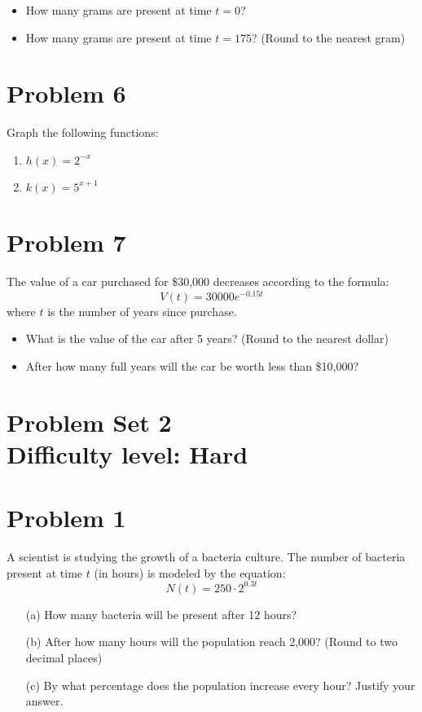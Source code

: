 \documentclass[12pt]{article}
\begin{document}
\begin{itemize}
    \item How many grams are present at time \( t = 0 \)?
    \item How many grams are present at time \( t = 175 \)? (Round to the nearest gram)
\end{itemize}

\section*{Problem 6}
Graph the following functions:
\begin{enumerate}[label=(\alph*)]
    \item \( h(x) = 2^{-x} \)
    \item \( k(x) = 5^{x+1} \)
\end{enumerate}

\section*{Problem 7}
The value of a car purchased for \$30{,}000 decreases according to the formula:
\[
V(t) = 30000e^{-0.15t}
\]
where \( t \) is the number of years since purchase.

\begin{itemize}
    \item What is the value of the car after 5 years? (Round to the nearest dollar)
    \item After how many full years will the car be worth less than \$10{,}000?
\end{itemize}

\section*{Problem Set 2\\Difficulty level: Hard}
\section*{Problem 1}
A scientist is studying the growth of a bacteria culture. The number of bacteria present at time \( t \) (in hours) is modeled by the equation:
\[
N(t) = 250 \cdot 2^{0.3t}
\]

\begin{itemize}
    \item[(a)] How many bacteria will be present after 12 hours?
    \item[(b)] After how many hours will the population reach 2,000? (Round to two decimal places)
    \item[(c)] By what percentage does the population increase every hour? Justify your answer.
\end{itemize}
\end{document}
